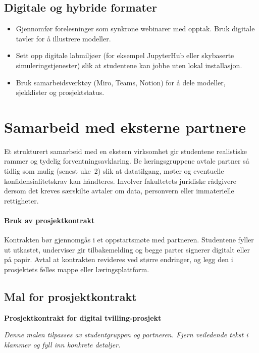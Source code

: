 \subsection{Digitale og hybride formater}
\begin{itemize}
    \item Gjennomfør forelesninger som synkrone webinarer med opptak. Bruk digitale tavler for å illustrere modeller.
    \item Sett opp digitale labmiljøer (for eksempel JupyterHub eller skybaserte simuleringstjenester) slik at studentene kan jobbe uten lokal installasjon.
    \item Bruk samarbeidsverktøy (Miro, Teams, Notion) for å dele modeller, sjekklister og prosjektstatus.
\end{itemize}

\section{Samarbeid med eksterne partnere}
Et strukturert samarbeid med en ekstern virksomhet gir studentene realistiske rammer og tydelig forventningsavklaring. Be læringsgruppene avtale partner så tidlig som mulig (senest uke~2) slik at datatilgang, møter og eventuelle konfidensialitetskrav kan håndteres. Involver fakultetets juridiske rådgivere dersom det kreves særskilte avtaler om data, personvern eller immaterielle rettigheter.

\paragraph{Bruk av prosjektkontrakt}
Kontrakten bør gjennomgås i et oppstartsmøte med partneren. Studentene fyller ut utkastet, underviser gir tilbakemelding og begge parter signerer digitalt eller på papir. Avtal at kontrakten revideres ved større endringer, og legg den i prosjektets felles mappe eller læringsplattform.

\subsection*{Mal for prosjektkontrakt}
\noindent\textbf{Prosjektkontrakt for digital tvilling-prosjekt}\par
\noindent\textit{Denne malen tilpasses av studentgruppen og partneren. Fjern veiledende tekst i klammer og fyll inn konkrete detaljer.}

